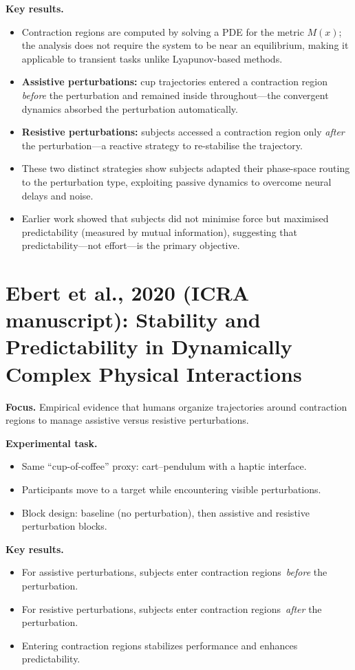 \documentclass[11pt]{article}
\begin{document}
\textbf{Key results.}
\begin{itemize}[leftmargin=1.2em]
  \item Contraction regions are computed by solving a PDE for the metric $M(x)$; the analysis does not require the system to be near an equilibrium, making it applicable to transient tasks unlike Lyapunov-based methods.
  \item \textbf{Assistive perturbations:} cup trajectories entered a contraction region \emph{before} the perturbation and remained inside throughout---the convergent dynamics absorbed the perturbation automatically.
  \item \textbf{Resistive perturbations:} subjects accessed a contraction region only \emph{after} the perturbation---a reactive strategy to re-stabilise the trajectory.
  \item These two distinct strategies show subjects adapted their phase-space routing to the perturbation type, exploiting passive dynamics to overcome neural delays and noise.
  \item Earlier work showed that subjects did not minimise force but maximised predictability (measured by mutual information), suggesting that predictability---not effort---is the primary objective.
\end{itemize}

\section{Ebert et al., 2020 (ICRA manuscript): Stability and Predictability in Dynamically Complex Physical Interactions}
\textbf{Focus.} Empirical evidence that humans organize trajectories around contraction regions to manage assistive versus resistive perturbations.

\textbf{Experimental task.}
\begin{itemize}[leftmargin=1.2em]
  \item Same ``cup-of-coffee'' proxy: cart--pendulum with a haptic interface.
  \item Participants move to a target while encountering visible perturbations.
  \item Block design: baseline (no perturbation), then assistive and resistive perturbation blocks.
\end{itemize}

\textbf{Key results.}
\begin{itemize}[leftmargin=1.2em]
  \item For assistive perturbations, subjects enter contraction regions \,\emph{before} the perturbation.
  \item For resistive perturbations, subjects enter contraction regions \,\emph{after} the perturbation.
  \item Entering contraction regions stabilizes performance and enhances predictability.
\end{itemize}
\end{document}
